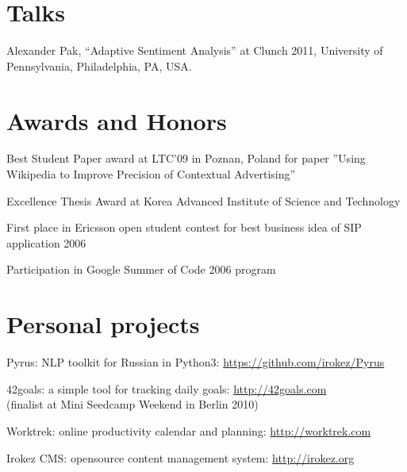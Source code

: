 \documentclass[letterpaper]{article}
\renewenvironment{itemize}{
  \begin{list}{}{
    \setlength{\leftmargin}{0.6em}
  }
}{
  \end{list}
}
\begin{document}
\section*{Talks}

\begin{itemize}

\item Alexander Pak, ``Adaptive Sentiment Analysis'' at Clunch 2011, University of
Pennsylvania, Philadelphia, PA, USA.

\end{itemize}

\section*{Awards and Honors}

\begin{itemize}

\item Best Student Paper award at LTC'09 in Poznan, Poland for paper ''Using Wikipedia to Improve Precision of Contextual Advertising''

\item Excellence Thesis Award at Korea Advanced Institute of Science and Technology

\item First place in Ericsson open student contest for best business idea of SIP application 2006

\item Participation in Google Summer of Code 2006 program

\end{itemize}


\section*{Personal projects}

\begin{itemize}

\item Pyrus: NLP toolkit for Russian in Python3: \url{https://github.com/irokez/Pyrus}
\item 42goals: a simple tool for tracking daily goals: \url{http://42goals.com} \\
(finalist at Mini Seedcamp Weekend in Berlin 2010)
\item Worktrek: online productivity calendar and planning: \url{http://worktrek.com}
\item Irokez CMS: opensource content management system: \url{http://irokez.org}

\end{itemize}
\end{document}

